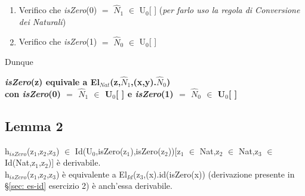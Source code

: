 \begin{enumerate}
\item Verifico che \textit{isZero}(0) $=$ $\hat{N}_1$ $\in$ U$_0$[ ] (\textit{per farlo uso la regola di Conversione dei Naturali})

\begin{prooftree}



\end{prooftree}
\noindent

\item Verifico che \textit{isZero}(1) $=$ $\hat{N}_0$ $\in$ U$_0$[ ]

\begin{prooftree}




\end{prooftree}
\noindent
\end{enumerate}
\noindent
Dunque \begin{center}\textbf{\textit{isZero}(z) equivale a El$_{Nat}$(z,$\hat{N}_1$,(x,y).$\hat{N}_0$)\\
con \textit{isZero}(0) $=$ $\hat{N}_1$ $\in$ U$_0$[ ] e \textit{isZero}(1) $=$ $\hat{N}_0$ $\in$ U$_0$[ ]}\end{center}

\subsection{Lemma 2}
h$_{isZero}$(z$_1$,z$_2$,z$_3$) $\in$ Id(U$_0$,isZero(z$_1$),isZero(z$_2$))[z$_1$ $\in$ Nat,z$_2$ $\in$ Nat,z$_3$ $\in$ Id(Nat,z$_1$,z$_2$)] \`e derivabile.\\
h$_{isZero}$(z$_1$,z$_2$,z$_3$) \`e equivalente a El$_{Id}$(z$_3$,(x).id(isZero(x)) (derivazione presente in \S\ref{sec: es-id} esercizio 2) \`e anch'essa derivabile.

